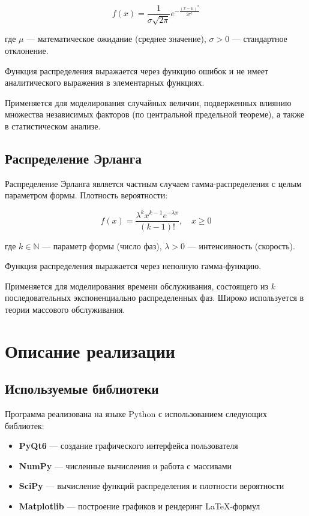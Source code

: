 \begin{equation}
f(x) = \frac{1}{\sigma\sqrt{2\pi}} e^{-\frac{(x-\mu)^2}{2\sigma^2}}
\end{equation}

где $\mu$ --- математическое ожидание (среднее значение), $\sigma > 0$ --- стандартное отклонение.

Функция распределения выражается через функцию ошибок и не имеет аналитического выражения в элементарных функциях.

Применяется для моделирования случайных величин, подверженных влиянию множества независимых факторов (по центральной предельной теореме), а также в статистическом анализе.

\subsection{Распределение Эрланга}

Распределение Эрланга является частным случаем гамма-распределения с целым параметром формы. Плотность вероятности:

\begin{equation}
f(x) = \frac{\lambda^k x^{k-1} e^{-\lambda x}}{(k-1)!}, \quad x \geq 0
\end{equation}

где $k \in \mathbb{N}$ --- параметр формы (число фаз), $\lambda > 0$ --- интенсивность (скорость).

Функция распределения выражается через неполную гамма-функцию.

Применяется для моделирования времени обслуживания, состоящего из $k$ последовательных экспоненциально распределенных фаз. Широко используется в теории массового обслуживания.

\section{Описание реализации}

\subsection{Используемые библиотеки}

Программа реализована на языке Python с использованием следующих библиотек:

\begin{itemize}
    \item \textbf{PyQt6} --- создание графического интерфейса пользователя
    \item \textbf{NumPy} --- численные вычисления и работа с массивами
    \item \textbf{SciPy} --- вычисление функций распределения и плотности вероятности
    \item \textbf{Matplotlib} --- построение графиков и рендеринг LaTeX-формул
\end{itemize}


